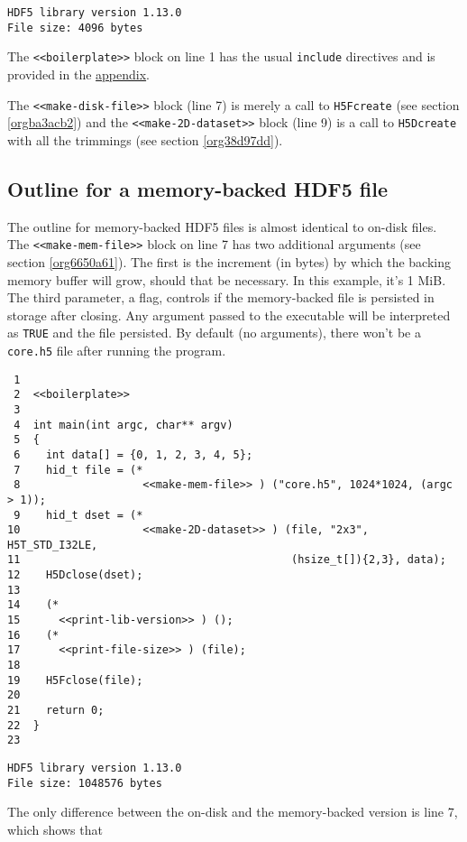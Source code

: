 \documentclass[a4paper, 12pt]{article}
\begin{document}
\begin{verbatim}
HDF5 library version 1.13.0
File size: 4096 bytes
\end{verbatim}

The \texttt{<<boilerplate>>} block on line 1 has the usual \texttt{include}
directives and is provided in the \hyperref[sec:orgd07fd63]{appendix}.

The \texttt{<<make-disk-file>>} block (line 7) is merely a call to
\texttt{H5Fcreate} (see section \ref{orgba3acb2}) and the
\texttt{<<make-2D-dataset>>} block (line 9) is a call to \texttt{H5Dcreate} with
all the trimmings (see section \ref{org38d97dd}).

\subsection{Outline for a memory-backed HDF5 file}
\label{sec:org902b199}

The outline for memory-backed HDF5 files is almost identical to on-disk
files. The \texttt{<<make-mem-file>>} block on line 7 has two
additional arguments (see section \ref{org6650a61}). The first is the
increment (in bytes) by which the backing memory buffer will grow, should
that be necessary. In this example, it's 1 MiB. The third parameter, a flag,
controls if the memory-backed file is persisted in storage after closing.
Any argument passed to the executable will be interpreted as \texttt{TRUE} and the
file persisted. By default (no arguments), there won't be a \texttt{core.h5} file
after running the program.

\begin{verbatim}
 1
 2  <<boilerplate>>
 3
 4  int main(int argc, char** argv)
 5  {
 6    int data[] = {0, 1, 2, 3, 4, 5};
 7    hid_t file = (*
 8                   <<make-mem-file>> ) ("core.h5", 1024*1024, (argc > 1));
 9    hid_t dset = (*
10                   <<make-2D-dataset>> ) (file, "2x3", H5T_STD_I32LE,
11                                          (hsize_t[]){2,3}, data);
12    H5Dclose(dset);
13
14    (*
15      <<print-lib-version>> ) ();
16    (*
17      <<print-file-size>> ) (file);
18
19    H5Fclose(file);
20
21    return 0;
22  }
23
\end{verbatim}

\begin{verbatim}
HDF5 library version 1.13.0
File size: 1048576 bytes
\end{verbatim}

The only difference between the on-disk and the memory-backed version is
line 7, which shows that
\end{document}
